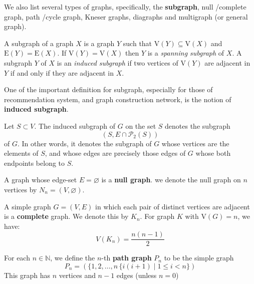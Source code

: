 We also list several types of graphs, specifically, the \textbf{subgraph}, null /complete graph, path /cycle graph, Kneser graphs, diagraphs and multigraph (or general graph). 

\begin{definition}[Subgraph]
    A subgraph of a graph $X$ is a graph $Y$ such that $\mathrm{V}(Y)\subseteq \mathrm{V}(X)$ and $\mathrm{E}(Y)=\mathrm{E}(X)$. If $\mathrm{V}(Y) = \mathrm{V}(X)$ then $Y$ is a \textit{spanning subgraph} of $X$. A subgraph $Y$ of $X$ is an \textit{induced subgraph} if two vertices of $\mathrm{V}(Y)$ are adjacent in $Y$ if and only if they are adjacent in $X$. 
\end{definition}

One of the important definition for subgraph, especially for those of recommendation system, and graph construction network, is the notion of \textbf{induced subgraph}. 
\begin{definition}
    Let $S\subset V$. The induced subgraph of $G$ on the set $S$ denotes the subgraph \begin{equation}
        (S, E\cap \mathcal{P}_2 (S))
    \end{equation}
    of $G$. In other words, it denotes the subgraph of $G$ whose vertices are the elements of $S$, and whose edges are precisely those edges of $G$ whose both endpoints belong to $S$. 
\end{definition}

\begin{definition}
    A graph whose edge-set $E=\varnothing$ is a \textbf{null graph}. we denote the null graph on $n$ vertices by $N_{n}=(V,\varnothing)$. 
\end{definition}

\begin{definition}
    A simple graph $G=(V,E)$ in which each pair of distinct vertices are adjacent is a \textbf{complete} graph. We denote this by $K_{n}$. For graph $K$ with $\mathrm{V}(G)= n$, we have: \begin{equation}
        V(K_n) = \frac{n(n-1)}{2}
    \end{equation}
\end{definition}

\begin{definition}
    For each $n\in \mathbb{N}$, we define the $n$-th \textbf{path graph} $P_n$ to be the simple graph \begin{equation}
        P_n = (\{1,2,\dots,n\, \{ i(i+1) \mid 1 \leq i < n \})
    \end{equation}
    This graph has $n$ vertices and $n-1$ edges (unless $n=0$)
\end{definition}

